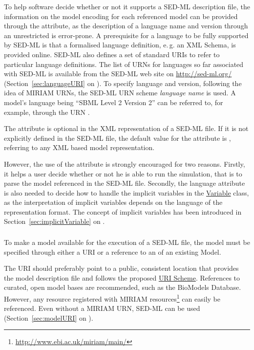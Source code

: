 To help  software decide whether or not it supports a SED-ML description file, the information on the model encoding for each referenced model can be provided through the  attribute, as the description of a language name and version through an unrestricted  is error-prone. 
A prerequisite for a language to be fully supported by SED-ML is that a formalised language definition, e.\,g. an XML Schema, is provided online. SED-ML also defines a set of standard URIs to refer to particular language definitions. 
The list of URNs for languages so far associated with SED-ML is available from the SED-ML web site on \url{http://sed-ml.org/}  (Section~\ref{sec:languageURI} on ). 
To specify language and version, following the idea of MIRIAM URNs, the SED-ML URN scheme \emph{language name} is used. A model's language being ``SBML Level 2 Version 2'' can be referred to, for example, through the URN .

The  attribute is optional in the XML representation of a SED-ML file. 
If it is not explicitly defined in the SED-ML file, the default value for the  attribute is , referring to any XML based model representation. 

However, the use of the  attribute is strongly encouraged for two reasons. 
Firstly, it helps a user decide whether or not he is able to run the simulation, that is to parse the model referenced in the SED-ML file. 
Secondly, the language attribute is also needed to decide how to handle the implicit variables in the \hyperref[class:variable]{Variable} class, as the interpretation of implicit variables depends on the language of the representation format. The concept of implicit variables has been introduced in Section~\ref{sec:implicitVariable} on .


\subsubsection{}
\label{sec:model_source}
To make a model available for the execution of a SED-ML file, the model  must be specified through either a URI or a reference to an  of an existing Model. 

The URI should preferably point to a public, consistent location that provides the model description file and follows the proposed \hyperref[sec:uriScheme]{URI Scheme}. References to curated, open model bases are recommended, such as the BioModels Database. However, any resource registered with MIRIAM resources\footnote{\url{http://www.ebi.ac.uk/miriam/main/}} can easily be referenced. Even without a MIRIAM URN, SED-ML can be used (Section~\ref{sec:modelURI} on ).

